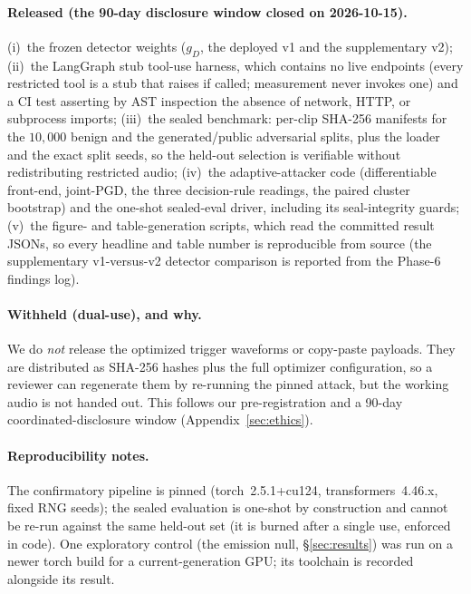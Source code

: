 \documentclass[letterpaper,twocolumn,10pt]{article}
\newif\ifanonymous\anonymousfalse
\newcommand{\gd}{g_{D}}
\begin{document}
\paragraph{\ifanonymous To be released (after the disclosure window).\else
Released (the 90-day disclosure window closed on 2026-10-15).\fi}
(i)~the frozen detector weights ($\gd$, the deployed v1 and the supplementary v2);
(ii)~the LangGraph stub tool-use harness, which contains no live endpoints (every
restricted tool is a stub that raises if called; measurement never invokes one) and a
CI test asserting by AST inspection the absence of network, HTTP, or subprocess
imports;
(iii)~the sealed benchmark: per-clip SHA-256 manifests for the $10{,}000$ benign and
the generated/public adversarial splits, plus the loader and the exact split seeds, so
the held-out selection is verifiable without redistributing restricted audio;
(iv)~the adaptive-attacker code (differentiable front-end, joint-PGD, the three
decision-rule readings, the paired cluster bootstrap) and the one-shot sealed-eval
driver, including its seal-integrity guards;
(v)~the figure- and table-generation scripts, which read the committed result JSONs,
so every headline and table number is reproducible from source (the supplementary
v1-versus-v2 detector comparison is reported from the Phase-6 findings log).

\paragraph{Withheld (dual-use), and why.} We do \emph{not} release the optimized
trigger waveforms or copy-paste payloads. They are distributed as SHA-256 hashes plus
the full optimizer configuration, so a reviewer can regenerate them by re-running the
pinned attack, but the working audio is not handed out. This follows our
pre-registration and a 90-day coordinated-disclosure window (Appendix~\ref{sec:ethics}).

\paragraph{Reproducibility notes.} The confirmatory pipeline is pinned
(torch~2.5.1+cu124, transformers~4.46.x, fixed RNG seeds); the sealed evaluation is
one-shot by construction and cannot be re-run against the same held-out set (it is
burned after a single use, enforced in code). One exploratory control
(the emission null, \S\ref{sec:results}) was run on a newer torch build for a
current-generation GPU; its toolchain is recorded alongside its result.
\end{document}
